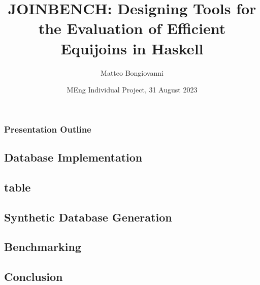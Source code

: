 \documentclass{beamer}
\title[JOINBENCH]{JOINBENCH: Designing Tools for the Evaluation of Efficient Equijoins in Haskell}
\author{Matteo Bongiovanni}
\date{MEng Individual Project, 31 August 2023}
\institute[JMC]{Joint Mathematics and Computing \\ Department of Computing}
\begin{document}
\frame{\titlepage}

\begin{frame}
\frametitle{Presentation Outline}
\tableofcontents
\end{frame}

\begin{frame}
\section{Database Implementation}
\end{frame}

\begin{frame}
\section{ table}
\end{frame}

\begin{frame}
\section{Synthetic Database Generation}
\end{frame}

\begin{frame}
\section{Benchmarking}
\end{frame}

\begin{frame}
\section{Conclusion}
\end{frame}
\end{document}
